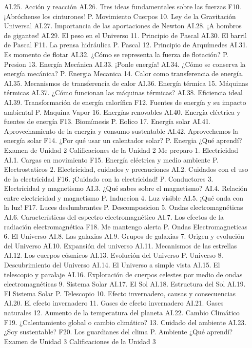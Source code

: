 AI.25.	Acción y reacción
AI.26.	Tres ideas fundamentales sobre las fuerzas
F10.	¡Abróchense los cinturones!
P.	Movimiento Cuerpos
10.	Ley de la Gravitación Universal
AI.27.	Importancia de las aportaciones de Newton
AI.28.	¡A hombros de gigantes!
AI.29.	El peso en el Universo
11.	Principio de Pascal
AI.30.	El barril de Pascal
F11.	La prensa hidráulica
P.	Pascal
12.	Principio de Arquímedes
AI.31.	Es momento de flotar
AI.32.	¿Cómo se representa la fuerza de flotación?
P.	Presion
13.	Energía Mecánica
AI.33.	¡Ponle energía!
AI.34.	¿Cómo se conserva la energía mecánica?
P.	Energia Mecanica
14.	Calor como transferencia de energía.
AI.35.	Mecanismos de transferencia de calor
AI.36.	Energía térmica
15.	Máquinas térmicas
AI.37.	¿Cómo funcionan las máquinas térmicas?
AI.38.	Eficiencia ideal
AI.39.	Transformación de energía calorífica
F12.	Fuentes de energía y su impacto ambiental
P.	Maquina Vapor
16.	Energías renovables
AI.40.	Energía eléctrica y fuentes de energía
F13.	Biomímesis
P.	Eolico
17.	Energía solar
AI.41.	Aprovechamiento de la energía y consumo sustentable
AI.42.	Aprovechemos la energía solar
F14.	¿Por qué usar un calentador solar?
P.	Energia
¿Qué aprendí?
Examen de Unidad 2
Calificaciones de la Unidad 2
Me preparo
1.	Electricidad
AI.1.	Cargas en movimiento
F15.	Energía eléctrica y medio ambiente
P.	Electrostaticos
2.	Electricidad, cuidados y precauciones 
AI.2.	Cuidados con el uso de la electricidad
F16.	¡Cuidado con la electricidad!
P.	Conductores
3.	Electricidad y magnetismo 
AI.3.	¿Qué sabes sobre el magnetismo?
AI.4.	Relación entre electricidad y magnetismo
P.	Induccion
4.	Luz visible 
AI.5.	¡Qué onda con la luz!
F17.	Luces deslumbrantes
P.	Descomposicion
5.	Ondas electromagnéticas
AI.6.	Características del espectro electromagnético
AI.7.	Los efectos de la radiación electromagnética
F18.	Me mantengo alerta
P.	Ondas Electromagneticas
6.	El Universo 
AI.8.	Las galaxias
AI.9.	Grupos de galaxias
7.	Origen y evolución del Universo 
AI.10.	Expansión del universo
AI.11.	Mecanismos de las estrellas
AI.12.	Los cuerpos cósmicos
AI.13.	Evolución del Universo
P.	Universo
8.	Descubrimiento del Universo
AI.14.	El Universo a simple vista
AI.15.	El telescopio y paralaje
AI.16.	Exploración de cuerpos celestes por medio de ondas electromagnéticas
9.	Sistema Solar 
AI.17.	El Sol
AI.18.	Estructura del Sol
AI.19.	El Sistema Solar
P.	Telescopio
10.	Efecto invernadero, causas y consecuencias 
AI.20.	El efecto invernadero
11.	Gases de efecto invernadero 
AI.21.	Gases naturales
12.	Aumento de la temperatura del planeta 
AI.22.	Cambio Climático
F19.	¿Calentamiento global o cambio climático?
13.	Cuidado del ambiente 
AI.23.	¿Soy sustentable?
F20.	Los guardianes del clima
P.	Ambiente
¿Qué aprendí?
Examen de Unidad 3
Calificaciones de la Unidad 3